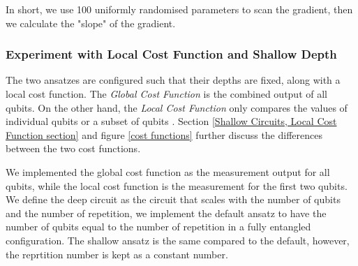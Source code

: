 In short, we use 100 uniformly randomised parameters to scan the gradient, then we calculate the "slope" of the gradient.

\subsubsection{Experiment with Local Cost Function and Shallow Depth}
The two ansatzes are configured such that their depths are fixed, along with a local cost function.
The \textit{Global Cost Function} is the combined output of all qubits. 
On the other hand, the \textit{Local Cost Function} only compares the values of individual qubits or a subset of qubits \cite{cerezoCostFunctionDependent2021}.
Section \ref{Shallow Circuits, Local Cost Function section} and figure \ref{cost functions} further discuss the differences between the two cost functions.

We implemented the global cost function as the measurement output for all qubits, while the local cost function is the measurement for the first two qubits.
We define the deep circuit as the circuit that scales with the number of qubits and the number of repetition, we implement the default ansatz to have the number of qubits equal to the number of repetition in a fully entangled configuration. 
The shallow ansatz is the same compared to the default, however, the reprtition number is kept as a constant number.